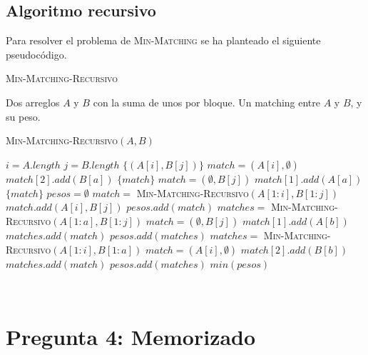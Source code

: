 \documentclass[conference]{IEEEtran}
\begin{document}
\subsection{Algoritmo recursivo}
Para resolver el problema de \textsc{Min-Matching} se ha planteado el siguiente pseudocódigo.
\begin{algorithm}
\caption{\textsc{Min-Matching-Recursivo}}
\scriptsize
\begin{algorithmic}
\REQUIRE Dos arreglos $A$ y $B$ con la suma de unos por bloque.
\ENSURE Un matching entre $A$ y $B$, y su peso.
\begin{flushleft}
\textsc{Min-Matching-Recursivo}$(A,B)$
\end{flushleft}
    \STATE $i=A.length$
    \STATE $j=B.length$
        \RETURN $\{(A[i],B[j])\}$
            \STATE $match=(A[i],\emptyset)$
                \STATE $match[2].add(B[a])$
            \ENDFOR
            \RETURN $\{match\}$
        \ELSE
            \STATE $match=(\emptyset,B[j])$
                \STATE $match[1].add(A[a])$
            \ENDFOR
            \RETURN $\{match\}$
        \ENDIF
    \ELSE
        \STATE $pesos=\emptyset$
        \STATE $match=$ \textsc{Min-Matching-Recursivo}$(A[1:i],B[1:j])$
        \STATE $match.add(A[i],B[j])$
        \STATE $pesos.add(match)$
            \STATE $matches=$ \textsc{Min-Matching-Recursivo}$(A[1:a],B[1:j])$
            \STATE $match=(\emptyset,B[j])$
                \STATE $match[1].add(A[b])$
            \ENDFOR
            \STATE $matches.add(match)$
            \STATE $pesos.add(matches)$
        \ENDFOR
            \STATE $matches=$ \textsc{Min-Matching-Recursivo}$(A[1:i],B[1:a])$
            \STATE $match=(A[i],\emptyset)$
                \STATE $match[2].add(B[b])$
            \ENDFOR
            \STATE $matches.add(match)$
            \STATE $pesos.add(matches)$
        \ENDFOR
    \RETURN $min(pesos)$
    \ENDIF
\end{algorithmic}
\label{alg:min-matching-recursivo}
\end{algorithm}
\verb| |\\
\section{Pregunta 4: Memorizado}
\end{document}
